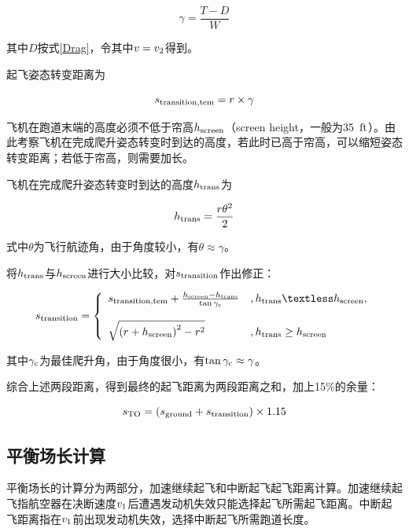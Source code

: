 \documentclass[a4paper,punct,space,heading=true,AutoFakeBold]{ctexrep}
\begin{document}
\begin{equation}
\gamma=\frac{T-D}{W}
\end{equation}

其中$D$按式\ref{Drag}，令其中$v=v_{\rm 2}$得到。

起飞姿态转变距离为

\begin{equation}
s_{\rm transition,tem}=r\times\gamma
\end{equation}

飞机在跑道末端的高度必须不低于帘高$h_{\rm screen}$（screen height，一般为35\ $\rm ft$）。由此考察飞机在完成爬升姿态转变时到达的高度，若此时已高于帘高，可以缩短姿态转变距离；若低于帘高，则需要加长。

飞机在完成爬升姿态转变时到达的高度$h_{\rm trans}$为

\begin{equation}
h_{\rm trans}=\frac{r\theta^2}{2}
\end{equation}

式中$\theta$为飞行航迹角，由于角度较小，有$\theta\approx\gamma$。

将$h_{\rm trans}$与$h_{\rm screen}$进行大小比较，对$s_{\rm transition}$作出修正：

\begin{equation}
s_{\rm transition}=\left\{\begin{array}{ll}
s_{\rm transition,tem}+\frac{h_{\rm screen}-h_{\rm trans}}{\tan\gamma_{\rm c}}   &   , h_{\rm trans}\textless h_{\rm screen},\\   
&\\ 
\sqrt{\left(r+h_{\rm screen}\right)^2-r^2}   &   , h_{\rm trans}\geq h_{\rm screen}
\end{array}\right.
\end{equation}

其中$\gamma_{\rm c}$为最佳爬升角，由于角度很小，有$\tan\gamma_{\rm c}\approx\gamma$。

综合上述两段距离，得到最终的起飞距离为两段距离之和，加上15\%的余量：

\begin{equation}
s_{\rm TO}=\left(s_{\rm ground}+s_{\rm transition}\right)\times 1.15
\end{equation}



\subsection{平衡场长计算}

平衡场长的计算分为两部分，加速继续起飞和中断起飞起飞距离计算。加速继续起飞指航空器在决断速度$v_{\rm 1}$后遭遇发动机失效只能选择起飞所需起飞距离。中断起飞距离指在$v_{\rm 1}$前出现发动机失效，选择中断起飞所需跑道长度。
\end{document}
